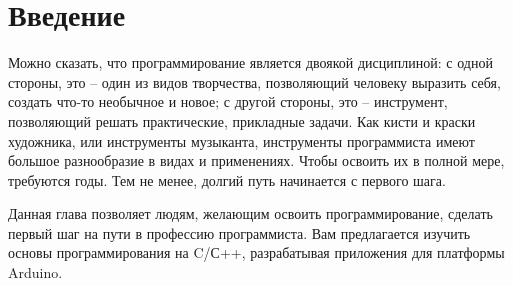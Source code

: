 \documentclass[../sparc.tex]{subfiles}
\begin{document}
\section{Введение}
Можно сказать, что программирование является двоякой дисциплиной: с одной
стороны, это – один из видов творчества, позволяющий человеку выразить себя,
создать что-то необычное и новое; с другой стороны, это – инструмент,
позволяющий решать практические, прикладные задачи.  Как кисти и краски
художника, или инструменты музыканта, инструменты программиста имеют большое
разнообразие в видах и применениях.  Чтобы освоить их в полной мере, требуются
годы.  Тем не менее, долгий путь начинается с первого шага.

Данная глава позволяет людям, желающим освоить программирование, сделать первый
шаг на пути в профессию программиста.  Вам предлагается изучить основы
программирования на C/С++, разрабатывая приложения для платформы Arduino.
\end{document}
